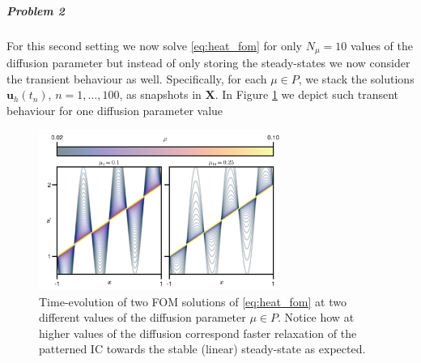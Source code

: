 \documentclass[../main.tex]{subfiles}
\begin{document}
\subparagraph{Problem 2}\label{subpar:problem2_fom}

For this second setting we now solve \eqref{eq:heat_fom} for only $N_{\mu}=10$ values of the diffusion parameter but instead of only storing the steady-states we now consider the transient behaviour as well.
Specifically, for each $\mu\in P$, we stack the solutions $\boldsymbol{u}_{h}(t_{n})$, $n=1,\dots,100$, as snapshots in $\boldsymbol{X}$.
In Figure \ref{fig:problem2_fom} we depict such transent behaviour for one diffusion parameter value 

\begin{figure}[H]
    \centering 
    \includegraphics[keepaspectratio, width=0.7\textwidth]{../figures/fig:problem2_fom.png}
    \caption{Time-evolution of two FOM solutions of \eqref{eq:heat_fom} at two different values of the diffusion parameter $\mu\in P$. Notice how at higher values of the diffusion correspond faster relaxation of the patterned IC towards the stable (linear) steady-state as expected.}
    \label{fig:problem2_fom}
\end{figure}
\end{document}
